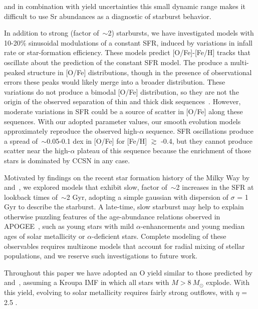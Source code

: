 and in combination with yield uncertainties this small dynamic range makes it 
difficult to use Sr abundances as a diagnostic of starburst behavior. 
\par 
In addition to strong (factor of~$\sim$2) starbursts, we have investigated 
models with 10-20\% sinusoidal modulations of a constant SFR, induced by 
variations in infall rate or star-formation efficiency. These models predict 
[O/Fe]-[Fe/H] tracks that oscillate about the prediction of the constant SFR 
model. The produce a multi-peaked structure in [O/Fe] distributions, though 
in the presence of observational errors these peaks would likely merge into 
a broader distribution. These variations do not produce a bimodal [O/Fe] 
distribution, so they are not the origin of the observed separation of thin 
and thick disk sequences~\citep[e.g.][]{Bensby2003, Hayden2015, 
BertranDeLis2016}. However, moderate variations in SFR could be a source of 
scatter in [O/Fe] along these sequences. With our adopted parameter values, 
our smooth evolution models approximately reproduce the observed high-$\alpha$ 
sequence. SFR oscillations produce a spread of~$\sim$0.05-0.1 dex in [O/Fe] 
for [Fe/H] $\gtrsim$ -0.4, but they cannot produce scatter near the 
high-$\alpha$ plateau of this sequence because the enrichment of those stars 
is dominated by CCSN in any case. 
\par 
Motivated by findings on the recent star formation history of the 
Milky Way by~\citet{Mor2019} and~\citet{Isern2019}, we explored 
models that exhibit slow, factor of~$\sim$2 increases in the SFR at lookback 
times of~$\sim$2 Gyr, adopting a simple gaussian with dispersion of $\sigma$ = 
1 Gyr to describe the starburst. A late-time, slow starburst may help to 
explain otherwise puzzling features of the age-abundance relations observed 
in APOGEE~\citep{Martig2016,SilvaAguirre2018,Feuillet2018,Feuillet2019}, such 
as young stars with mild $\alpha$-enhancements and young median ages of solar 
metallicity or $\alpha$-deficient stars. Complete modeling of these 
observables requires multizone models that account for radial mixing of 
stellar populations, and we reserve such investigations to future work. 
\par 
Throughout this paper we have adopted an O yield similar to those predicted 
by~\citet{Chieffi2004} and~\citet{Chieffi2013}, assuming a Kroupa IMF in which 
all stars with $M > 8\ M_\odot$ explode. With this yield, evolving to solar 
metallicity requires fairly strong outflows, with $\eta$ = 2.5
\citep[e.g.,][]{Finlator2008, Peeples2011, Andrews2017, Weinberg2017b}.
